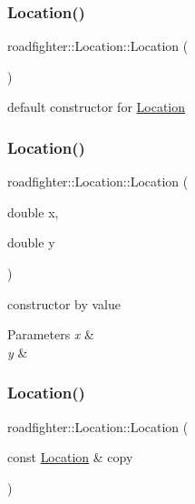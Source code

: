 \subsubsection{\texorpdfstring{Location()}{Location()}\hspace{0.1cm}{\footnotesize\ttfamily [1/4]}}
{\footnotesize\ttfamily roadfighter\+::\+Location\+::\+Location (\begin{DoxyParamCaption}{ }\end{DoxyParamCaption})\hspace{0.3cm}{\ttfamily [default]}}

default constructor for \hyperlink{classroadfighter_1_1Location}{Location} \mbox{\label{classroadfighter_1_1Location_a4c8cbcc76ddad6145cf0930c7840abc2}} 
\subsubsection{\texorpdfstring{Location()}{Location()}\hspace{0.1cm}{\footnotesize\ttfamily [2/4]}}
{\footnotesize\ttfamily roadfighter\+::\+Location\+::\+Location (\begin{DoxyParamCaption}\item[{double}]{x,  }\item[{double}]{y }\end{DoxyParamCaption})}

constructor by value 
\begin{DoxyParams}{Parameters}
{\em x} & \\
\hline
{\em y} & \\
\hline
\end{DoxyParams}
\mbox{\label{classroadfighter_1_1Location_ac3e3afdb0b4c32abdd92d771d1ddf2be}} 
\subsubsection{\texorpdfstring{Location()}{Location()}\hspace{0.1cm}{\footnotesize\ttfamily [3/4]}}
{\footnotesize\ttfamily roadfighter\+::\+Location\+::\+Location (\begin{DoxyParamCaption}\item[{const \hyperlink{classroadfighter_1_1Location}{Location} \&}]{copy }\end{DoxyParamCaption})\hspace{0.3cm}{\ttfamily [default]}}

